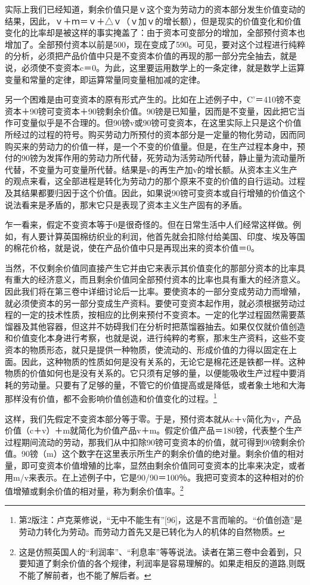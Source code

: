 \documentclass{ctexbook}
\begin{document}
    实际上我们已经知道，剩余价值只是ｖ这个变为劳动力的资本部分发生价值变动的结果，因此，ｖ＋ｍ＝ｖ＋△ｖ（ｖ加ｖ的增长额），但是现实的价值变化和价值变化的比率却是被这样的事实掩盖了：由于资本可变部分的增加，全部预付资本也增加了。全部预付资本以前是500，现在变成了590。可见，要对这个过程进行纯粹的分析，必须把产品价值中只是不变资本价值的再现的那一部分完全抽去，就是说，必须使不变资本c＝0。为此，这里要运用数学上的一条定律，就是数学上运算变量和常量的定律，即运算常量同变量相加减的定律。
    
    另一个困难是由可变资本的原有形式产生的。比如在上述例子中，C'＝410镑不变资本＋90镑可变资本＋90镑剩余价值。90镑是已知量，因而是不变量，因此把它当作可变量似乎是不合理的。但90镑v或90镑可变资本，在这里实际上只是这个价值所经过的过程的符号。购买劳动力所预付的资本部分是一定量的物化劳动，因而同购买来的劳动力的价值一样，是一个不变的价值量。但是，在生产过程本身中，预付的90镑为发挥作用的劳动力所代替，死劳动为活劳动所代替，静止量为流动量所代替，不变量为可变量所代替。结果是v的再生产加v的增长额。从资本主义生产的观点来看，这全部进程是转化为劳动力的那个原来不变的价值的自行运动。过程及其结果都要归因于这个价值。因此，如果说90镑可变资本或自行增殖的价值这个说法看来是矛盾的，那末它只是表现了资本主义生产固有的矛盾。
    
    乍一看来，假定不变资本等于0是很奇怪的。但在日常生活中人们经常这样做。例如，有人要计算英国棉纺织业的利润，他首先就会扣除付给美国、印度、埃及等国的棉花价格，就是说，使在产品价值中只是再现出来的资本价值＝0。
    
    当然，不仅剩余价值同直接产生它并由它来表示其价值变化的那部分资本的比率具有重大的经济意义，而且剩余价值同全部预付资本的比率也具有重大的经济意义。因此我们将在第三卷中详细讨论后一比率。要使资本的一部分变成劳动力而增殖，就必须使资本的另一部分变成生产资料。要使可变资本起作用，就必须根据劳动过程的一定的技术性质，按相应的比例来预付不变资本。一定的化学过程固然需要蒸馏器及其他容器，但这并不妨碍我们在分析时把蒸馏器抽去。如果仅仅就价值创造和价值变化本身进行考察，也就是说，进行纯粹的考察，那末生产资料，这些不变资本的物质形态，就只是提供一种物质，使流动的、形成价值的力得以固定在上面。因此，这种物质的性质如何是没有关系的，无论它是棉花还是铁都一样。这种物质的价值如何也是没有关系的。它只须有足够的量，以便能吸收生产过程中要消耗的劳动量。只要有了足够的量，不管它的价值提高或是降低，或者象土地和大海那样没有价值，都不会影响价值创造和价值变化的过程。\footnote{第2版注：卢克莱修说，“无中不能生有”[96]，这是不言而喻的。“价值创造”是劳动力转化为劳动。而劳动力首先又是已转化为人的机体的自然物质。}
    
    这样，我们先假定不变资本部分等于零。于是，预付资本就从c＋v简化为v，产品价值（c＋v）＋m就简化为价值产品v＋m。假定价值产品＝180镑，代表整个生产过程期间流动的劳动，那我们从中扣除90镑可变资本的价值，就可得到90镑剩余价值。90镑（m）这个数字在这里表示所生产的剩余价值的绝对量。剩余价值的相对量，即可变资本价值增殖的比率，显然由剩余价值同可变资本的比率来决定，或者用m/v来表示。在上述例子中，它是90/90＝100％。我把可变资本的这种相对的价值增殖或剩余价值的相对量，称为剩余价值率。\footnote{这是仿照英国人的“利润率”、“利息率”等等说法。读者在第三卷中会着到，只要知道了剩余价值的各个规律，利润率是容易理解的。如果走相反的道路,则既不能了解前者，也不能了解后者。}
    
\end{document}
